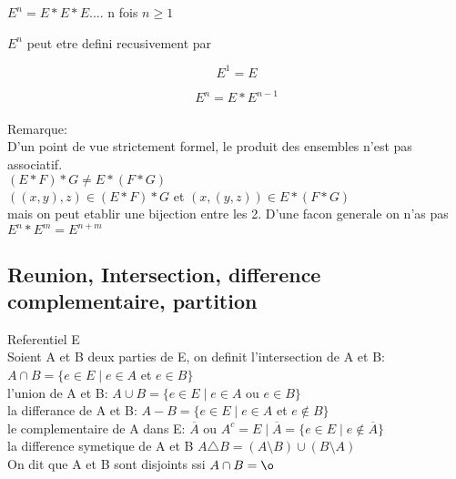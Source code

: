 \documentclass{article}
\begin{document}
$E^n = E * E * E ....$ n fois $n \geq 1$

$E^n$ peut etre defini recusivement
par 

$$E^1 = E$$

$$E^n = E * E^{n-1}$$\\


Remarque:\\
	D'un point de vue strictement formel, le produit des ensembles n'est pas associatif.\\
$(E*F)* G \ne E * (F*G)$\\
$((x,y),z) \in (E*F)*G$ et $(x,(y,z)) \in E*(F*G)$\\
mais on peut etablir une bijection entre les 2.
D'une facon generale on n'as pas $E^n * E^m = E^{n+m}$



\subsection{Reunion, Intersection, difference complementaire, partition}

Referentiel E\\
Soient A et B deux parties de E, on definit 
l'intersection de A et B: $A \cap B = \{e \in E \mid e \in A $ et $ e\in B\}$\\
l'union de A et B: $A \cup B = \{e \in E \mid e \in A$ ou $e\in B\}$\\
la differance de A et B: $A - B = \{e\in E \mid e\in A$ et $e\notin B\}$\\
le complementaire de A dans E: $\overline{A}$ ou $A^c  = E\mid \overline{A} = \{e\in E \mid e \notin \overline{A}\}$\\
la difference symetique de A et B $A \triangle B = (A\setminus B)\cup (B\setminus A)$\\
On dit que A et B sont disjoints ssi $A\cap B = \o$
\end{document}
